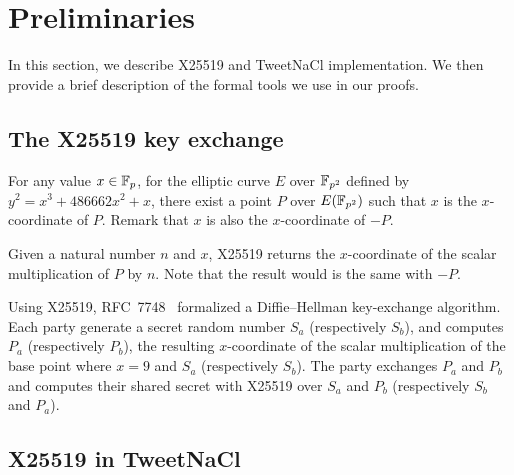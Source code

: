 \section{Preliminaries}
\label{preliminaries}

In this section, we describe X25519 and TweetNaCl implementation.
We then provide a brief description of the formal tools we use in our proofs.

\subsection{The X25519 key exchange}
\label{preliminaries:A}


For any value $x \in \mathbb{F}_{p}$, for the elliptic curve $E$ over $\mathbb{F}_{p^2}$
defined by $y^2 = x^3 + 486662 x^2 + x$, there exist a point $P$ over $E(\mathbb{F}_{p^2})$
such that $x$ is the $x$-coordinate of $P$. Remark that $x$ is also the $x$-coordinate of $-P$.

Given a natural number $n$ and $x$, X25519 returns the $x$-coordinate of the
scalar multiplication of $P$ by $n$. Note that the result would is the same with $-P$.

Using X25519, RFC~7748~\cite{rfc7748} formalized a Diffie–Hellman key-exchange algorithm.
Each party generate a secret random number $S_a$ (respectively $S_b$), and computes $P_a$ (respectively $P_b$),
the resulting $x$-coordinate of the scalar multiplication of the base point
where $x = 9$ and $S_a$ (respectively $S_b$).
The party exchanges $P_a$ and $P_b$ and computes their shared secret with X25519
over $S_a$ and $P_b$ (respectively $S_b$ and $P_a$).

\subsection{X25519 in TweetNaCl}
\label{preliminaries:B}

